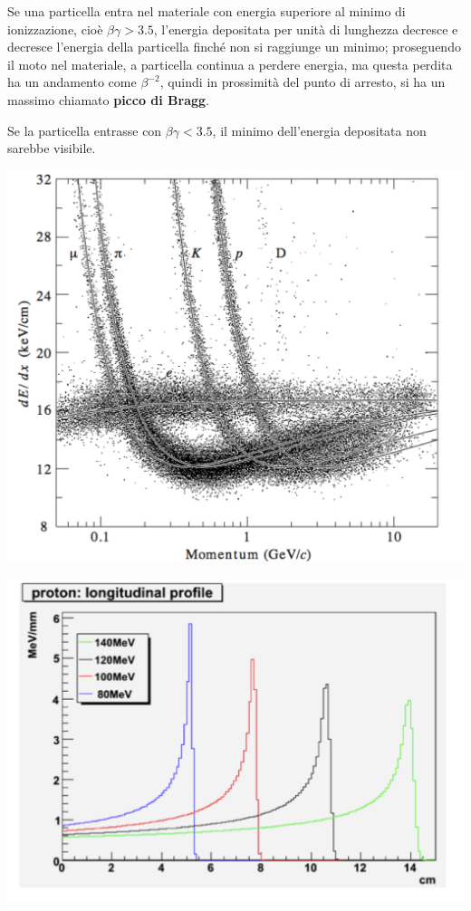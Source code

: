\documentclass[10pt, a4paper]{scrartcl}
\numberwithin{equation}{subsection}
\theoremstyle{style1}
\begin{document}
Se una particella entra nel materiale con energia superiore al minimo di ionizzazione, cio\`e $\beta  \gamma > 3.5$, l'energia depositata per unit\`a di lunghezza decresce e decresce l'energia della particella finch\'e non si raggiunge un minimo; proseguendo il moto nel materiale, a particella continua a perdere energia, ma questa perdita ha un andamento come $\beta ^{-2} $, quindi in prossimit\`a del punto di arresto, si ha un massimo chiamato \textbf{picco di Bragg}.

Se la particella entrasse con $\beta \gamma < 3.5$, il minimo dell'energia depositata non sarebbe visibile.
\begin{center}
	\begin{minipage}
		{0.45\columnwidth}
	\centering
	\includegraphics[width=\columnwidth]{pdx.png}
	\label{partdisc}
	\end{minipage}
	\hfill
	\begin{minipage}{.45\columnwidth}
	\centering
	\includegraphics[width=\columnwidth]{bragg.png}

\end{minipage}
\end{center}
\end{document}
